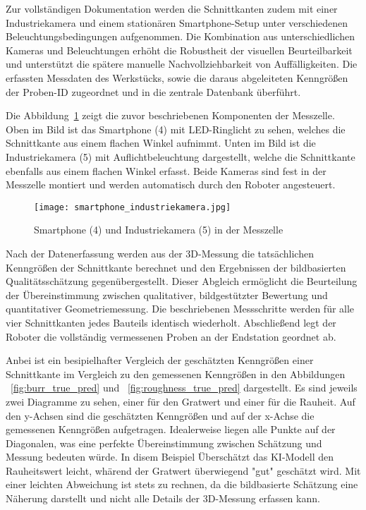 \newpage

Zur vollständigen Dokumentation werden die Schnittkanten zudem mit einer Industriekamera und einem stationären Smartphone-Setup unter verschiedenen Beleuchtungsbedingungen aufgenommen. Die Kombination aus unterschiedlichen Kameras und Beleuchtungen erhöht die Robustheit der visuellen Beurteilbarkeit und unterstützt die spätere manuelle Nachvollziehbarkeit von Auffälligkeiten. Die erfassten Messdaten des Werkstücks, sowie die daraus abgeleiteten Kenngrößen der Proben-ID zugeordnet und in die zentrale Datenbank überführt.

Die Abbildung~\ref{fig:smartphone_industriekamera} zeigt die zuvor beschriebenen Komponenten der Messzelle. Oben im Bild ist das Smartphone (4) mit LED-Ringlicht zu sehen, welches die Schnittkante aus einem flachen Winkel aufnimmt. Unten im Bild ist die Industriekamera (5) mit Auflichtbeleuchtung dargestellt, welche die Schnittkante ebenfalls aus einem flachen Winkel erfasst. Beide Kameras sind fest in der Messzelle montiert und werden automatisch durch den Roboter angesteuert.
\begin{figure}[htbp]
    \centering
    \texttt{[image: smartphone\_industriekamera.jpg]}
    \caption{Smartphone (4) und Industriekamera (5) in der Messzelle}
    \label{fig:smartphone_industriekamera}
\end{figure}

Nach der Datenerfassung werden aus der 3D-Messung die tatsächlichen Kenngrößen der Schnittkante berechnet und den Ergebnissen der bildbasierten Qualitätsschätzung gegenübergestellt. Dieser Abgleich ermöglicht die Beurteilung der Übereinstimmung zwischen qualitativer, bildgestützter Bewertung und quantitativer Geometriemessung. Die beschriebenen Messschritte werden für alle vier Schnittkanten jedes Bauteils identisch wiederholt. Abschließend legt der Roboter die vollständig vermessenen Proben an der Endstation geordnet ab.

Anbei ist ein besipielhafter Vergleich der geschätzten Kenngrößen einer Schnittkante im Vergleich zu den gemessenen Kenngrößen in den Abbildungen  ~\ref{fig:burr_true_pred} und ~\ref{fig:roughness_true_pred} dargestellt. Es sind jeweils zwei Diagramme zu sehen, einer für den Gratwert und einer für die Rauheit. Auf den y-Achsen sind die geschätzten Kenngrößen und auf der x-Achse die gemessenen Kenngrößen aufgetragen. Idealerweise liegen alle Punkte auf der Diagonalen, was eine perfekte Übereinstimmung zwischen Schätzung und Messung bedeuten würde. In disem Beispiel Überschätzt das KI-Modell den Rauheitswert leicht, whärend der Gratwert überwiegend "gut" geschätzt wird. Mit einer leichten Abweichung ist stets zu rechnen, da die bildbasierte Schätzung eine Näherung darstellt und nicht alle Details der 3D-Messung erfassen kann.

